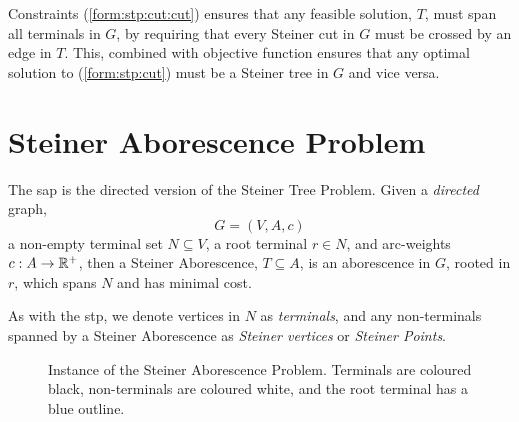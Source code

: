  Constraints (\ref{form:stp:cut:cut}) ensures that any feasible solution, $T$,  must span all terminals in $G$, by
 requiring that every Steiner cut in $G$ must be crossed by an edge in $T$. This, combined with objective function
  ensures that any optimal solution to (\ref{form:stp:cut}) must be a Steiner tree in $G$ and vice versa.

\section{Steiner Aborescence Problem}
The \gls{sap} is the directed version of the Steiner Tree Problem.
Given a \textit{directed} graph,
$$G = (V, A, c)$$
a non-empty terminal set $N \subseteq V$, a root terminal $r \in N$, and arc-weights $c : A \to \mathbb{R}^+$,
then a Steiner Aborescence, $T \subseteq A$, is an aborescence
in $G$, rooted in $r$, which spans $N$ and has minimal cost.

As with the \gls{stp}, we denote vertices in $N$ as \textit{terminals}, and any non-terminals spanned by a Steiner Aborescence as
 \textit{Steiner vertices} or \textit{Steiner Points}.
\begin{figure}[h]\centering
{}
\caption{Instance of the Steiner Aborescence Problem. Terminals are coloured black, non-terminals are coloured white, and the root terminal
  has a blue outline.}
\label{fig:sap:01}
\end{figure}

